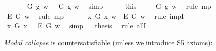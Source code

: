 \begin{isabellebody}
\ \ \ \ \isamarkupfalse%
\ \ {\isachardoublequoteopen}G\ g\ w\ {\isasymlongrightarrow}\ {\isasymE}\ G\ g\ w{\isachardoublequoteclose}\ \isamarkupfalse%
\ simp\isanewline
\ \ \ \ \isamarkupfalse%
\ this\ {}\ \isamarkupfalse%
\ {}{\isacharcolon}\ {\isachardoublequoteopen}{\isasymE}\ G\ g\ w{\isachardoublequoteclose}\ \isamarkupfalse%
\ {\isacharparenleft}rule\ mp{\isacharparenright}\isanewline
\ \ \ \ \isamarkupfalse%
\ {}\ {}\ \isamarkupfalse%
\ {\isachardoublequoteopen}{\isacharparenleft}\isactrlbold {\isasymbox}\isactrlbold {\isasymexists}\isactrlsup E\ G{\isacharparenright}\ w{\isachardoublequoteclose}\ \isamarkupfalse%
\ {\isacharparenleft}rule\ mp{\isacharparenright}\isanewline
\ \ \isacommand{{\isacharbraceright}}\isamarkupfalse%
\isanewline
\ \ \isamarkupfalse%
\ {\isachardoublequoteopen}{\isacharparenleft}{\isasymexists}x{\isachardot}\ G\ x\ w{\isacharparenright}\ {\isasymlongrightarrow}\ {\isacharparenleft}\isactrlbold {\isasymbox}\isactrlbold {\isasymexists}\isactrlsup E\ G{\isacharparenright}\ w{\isachardoublequoteclose}\ \isamarkupfalse%
\ {\isacharparenleft}rule\ impI{\isacharparenright}\isanewline
\ \ \isamarkupfalse%
\ {\isachardoublequoteopen}{\isacharparenleft}{\isacharparenleft}\isactrlbold {\isasymexists}x{\isachardot}\ G\ x{\isacharparenright}\ \isactrlbold {\isasymrightarrow}\ \ \isactrlbold {\isasymbox}\isactrlbold {\isasymexists}\isactrlsup E\ G{\isacharparenright}\ w{\isachardoublequoteclose}\ \isamarkupfalse%
\ simp\isanewline
\isacommand{{\isacharbraceright}}\isamarkupfalse%
\isanewline
\ \isamarkupfalse%
\ {\isacharquery}thesis\ \isamarkupfalse%
\ {\isacharparenleft}rule\ allI{\isacharparenright}\ \isanewline
{}\isamarkupfalse%
%
\endisatagproof
{\isafoldproof}%
%
\isadelimproof
%
\endisadelimproof
%
\begin{isamarkuptext}%
\emph{Modal collapse} is countersatisfiable (unless we introduce S5 axioms):%
\end{isamarkuptext}\isamarkuptrue%
\isamarkupfalse%
\ {\isachardoublequoteopen}{\isasymlfloor}\isactrlbold {\isasymforall}{\isasymPhi}{\isachardot}{\isacharparenleft}{\isasymPhi}\ \isactrlbold {\isasymrightarrow}\ {\isacharparenleft}\isactrlbold {\isasymbox}\ {\isasymPhi}{\isacharparenright}{\isacharparenright}{\isasymrfloor}{\isachardoublequoteclose}\ \isamarkupfalse%

\end{isabellebody}

